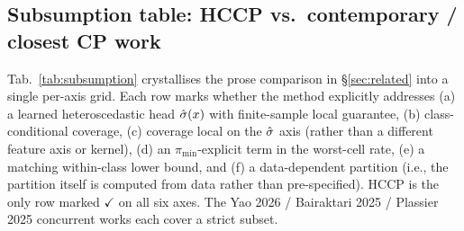 
\subsection{Subsumption table: HCCP vs.\ contemporary / closest CP work}
\label{app:tables:subsumption}

Tab.~\ref{tab:subsumption} crystallises the prose comparison in \S\ref{sec:related} into a single per-axis grid. Each row marks whether the method explicitly addresses (a) a learned heteroscedastic head $\hat{\sigma}(x)$ with finite-sample local guarantee, (b) class-conditional coverage, (c) coverage local on the $\hat{\sigma}$ axis (rather than a different feature axis or kernel), (d) an $\pi_{\min}$-explicit term in the worst-cell rate, (e) a matching within-class lower bound, and (f) a data-dependent partition (i.e., the partition itself is computed from data rather than pre-specified). HCCP is the only row marked $\checkmark$ on all six axes. The Yao 2026 / Bairaktari 2025 / Plassier 2025 concurrent works each cover a strict subset.

